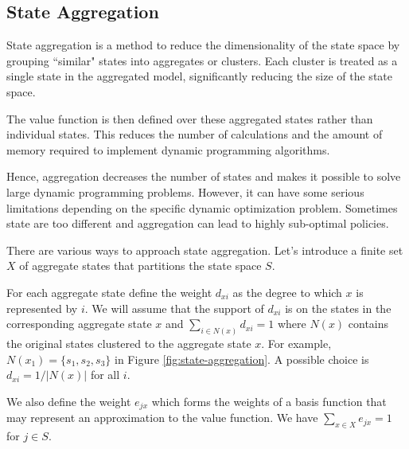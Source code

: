 \documentclass[letter,11pt]{article}
\begin{document}
\subsection{State Aggregation} \label{Section:StateAgg}



State aggregation is a method to reduce the dimensionality of the state space by grouping ``similar" states into aggregates or clusters. Each cluster is treated as a single state in the aggregated model, significantly reducing the size of the state space.

The value function is then defined over these aggregated states rather than individual states. This reduces the number of calculations and the amount of memory required to implement 
 dynamic programming algorithms.


Hence, aggregation decreases the number of states and makes it possible to solve large dynamic programming problems. However, it can have some serious limitations depending on the specific dynamic optimization problem. Sometimes state are too different and aggregation can lead to highly sub-optimal policies. 

There are various ways to approach state aggregation. Let's introduce a finite set $X$ of aggregate states that partitions the state space $S$. 


For each aggregate state define the weight $d_{xi}$ as the degree to which $x$ is represented by $i$. We will assume that the support of $d_{xi}$ is on the states in the  corresponding aggregate state $x$ and $\sum_{i \in N(x)} d_{xi} = 1$ where $N(x)$ contains the original states clustered to the aggregate state $x$. For example, $N(x_{1}) = \{s_{1},s_{2},s_{3} \}$ in Figure \ref{fig:state-aggregation}. A possible choice is $d_{xi} = 1 / |N(x)|$ for all $i$. 

We also define the weight $e_{jx}$ which forms the weights of a basis function that may represent an approximation to the value function. We have $\sum _{x \in X} e_{jx} = 1  $
for $j \in S$. 
\end{document}
